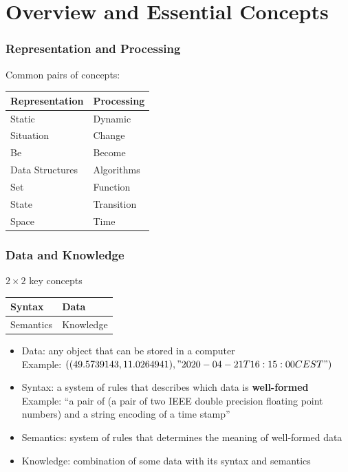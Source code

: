 \section{Overview and Essential Concepts}

\begin{frame}\frametitle{Representation and Processing}
Common pairs of concepts:
\begin{center}
\begin{tabular}{l|l}
Representation & Processing \\
\hline
Static & Dynamic \\
Situation & Change \\
Be & Become \\
Data Structures & Algorithms \\
Set & Function \\
State & Transition \\
Space & Time
\end{tabular}
\end{center}
\end{frame}

\begin{frame}\frametitle{Data and Knowledge}
$2\times 2$ key concepts
\begin{center}
\begin{tabular}{l|l}
Syntax & Data \\
\hline
Semantics & Knowledge
\end{tabular}
\end{center}

\begin{itemize}
\item Data: any object that can be stored in a computer\\
 Example: $((49.5739143, 11.0264941), "2020-04-21T16:15:00CEST")$
\item Syntax: a system of rules that describes which data is \textbf{well-formed}\\
 Example: ``a pair of (a pair of two IEEE double precision floating point numbers) and a string encoding of a time stamp''
\item Semantics: system of rules that determines the meaning of well-formed data
\item Knowledge: combination of some data with its syntax and semantics
\end{itemize}
\end{frame}

